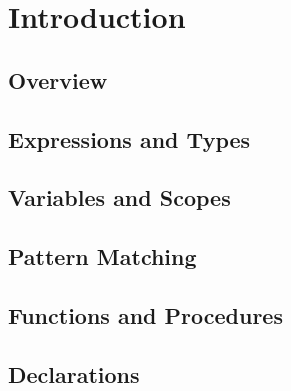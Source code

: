 \chapter{Introduction}

\section{Overview}

\section{Expressions and Types}

\section{Variables and Scopes}

\section{Pattern Matching}

\section{Functions and Procedures}

\section{Declarations}
